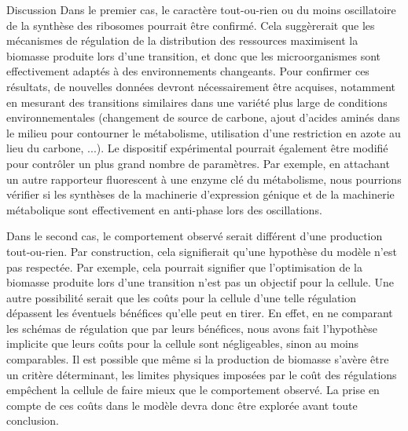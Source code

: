 \begin{chapter_summary}{Discussion}
Dans le premier cas, le caractère tout-ou-rien ou du moins oscillatoire de la synthèse des ribosomes pourrait être confirmé.
Cela suggèrerait que les mécanismes de régulation de la distribution des ressources maximisent la biomasse produite lors d'une transition, et donc que les microorganismes sont effectivement adaptés à des environnements changeants.
Pour confirmer ces résultats, de nouvelles données devront nécessairement être acquises, notamment en mesurant des transitions similaires dans une variété plus large de conditions environnementales (changement de source de carbone, ajout d'acides aminés dans le milieu pour contourner le métabolisme, utilisation d'une restriction en azote au lieu du carbone, ...).
Le dispositif expérimental pourrait également être modifié pour contrôler un plus grand nombre de paramètres.
Par exemple, en attachant un autre rapporteur fluorescent à une enzyme clé du métabolisme, nous pourrions vérifier si les synthèses de la machinerie d'expression génique et de la machinerie métabolique sont effectivement en anti-phase lors des oscillations.

Dans le second cas, le comportement observé serait différent d'une production tout-ou-rien.
Par construction, cela signifierait qu'une hypothèse du modèle n'est pas respectée.
Par exemple, cela pourrait signifier que l'optimisation de la biomasse produite lors d'une transition n'est pas un objectif pour la cellule.
Une autre possibilité serait que les coûts pour la cellule d'une telle régulation dépassent les éventuels bénéfices qu'elle peut en tirer.
En effet, en ne comparant les schémas de régulation que par leurs bénéfices, nous avons fait l'hypothèse implicite que leurs coûts pour la cellule sont négligeables, sinon au moins comparables.
Il est possible que même si la production de biomasse s'avère être un critère déterminant, les limites physiques imposées par le coût des régulations empêchent la cellule de faire mieux que le comportement observé.
La prise en compte de ces coûts dans le modèle devra donc être explorée avant toute conclusion.


\end{chapter_summary}
